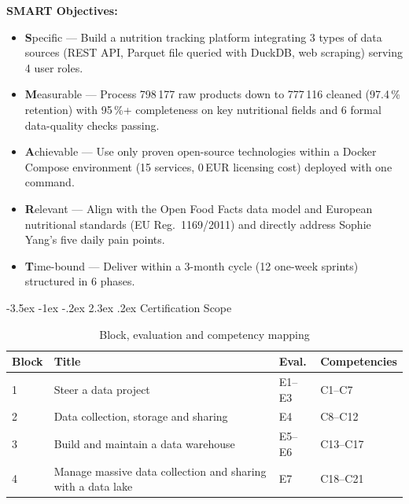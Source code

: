 \documentclass[a4paper,11pt,oneside,openany]{report}
\makeatletter
\renewcommand\section{\@startsection{section}{1}{\z@}%
  {-3.5ex \@plus -1ex \@minus -.2ex}%
  {2.3ex \@plus.2ex}%
  {\normalfont\Large\bfseries\color{ntgreen}}}
\newcommand{\off}{Open Food Facts}
\makeatother
\begin{document}
\textbf{SMART Objectives:}
\begin{itemize}[nosep]
  \item \textbf{S}pecific --- Build a nutrition tracking platform integrating
        3 types of data sources (REST API, Parquet file queried with DuckDB,
        web scraping) serving 4 user roles.
  \item \textbf{M}easurable --- Process 798\,177 raw products down to 777\,116
        cleaned (97.4\,\% retention) with 95\,\%+ completeness on key
        nutritional fields and 6 formal data-quality checks passing.
  \item \textbf{A}chievable --- Use only proven open-source technologies within
        a Docker Compose environment (15 services, 0\,EUR licensing cost)
        deployed with one command.
  \item \textbf{R}elevant --- Align with the \off{} data model and European
        nutritional standards (EU Reg.~1169/2011) and directly address Sophie
        Yang's five daily pain points.
  \item \textbf{T}ime-bound --- Deliver within a 3-month cycle (12 one-week
        sprints) structured in 6 phases.
\end{itemize}

\section{Certification Scope}

\begin{table}[H]
\centering
\caption{Block, evaluation and competency mapping}
\label{tab:bloc-eval}
\begin{tabularx}{\textwidth}{C{1.5cm} L{5cm} C{1.5cm} L{4cm}}
\toprule
\textbf{Block} & \textbf{Title} & \textbf{Eval.} & \textbf{Competencies} \\
 & Steer a data project & E1--E3 & C1--C7 \\
2 & Data collection, storage and sharing & E4 & C8--C12 \\
3 & Build and maintain a data warehouse & E5--E6 & C13--C17 \\
4 & Manage massive data collection and sharing with a data lake & E7 & C18--C21 \\
\bottomrule
\end{tabularx}
\end{table}

\end{document}
